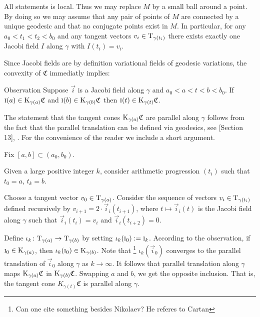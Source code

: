 \documentclass[a4paper,10pt]{article}
\begin{document}
{\color{red}  All statements is local.  Thus we may replace $M$ by a small ball around a point. By doing so we may assume that any pair of points of $M$ are connected by a unique geodesic and that no conjugate points exist in $M$.  In particular, for any $a_0<t_1<t_2<b_0$ and any tangent vectors $v_i \in \mathrm{T}_{\gamma (t_i)}$ there exists exactly one Jacobi field $I$ along $\gamma$ with
	$I(t_i)=v_i$.



Since Jacobi fields are by definition variational fields of geodesic variations, the convexity of $\mathfrak{C}$ immediatly implies: 

\begin{thm}{Observation}
	Suppose $\vec{i}$ is a Jacobi field along%
	 $\gamma$ and $a_0<a<t<b<b_0$. If 
	 $\text{\sc{i}}(a)\in \mathrm{K}_{\gamma(a)}\mathfrak{C}$ and $\text{\sc{i}}(b)\in \mathrm{K}_{\gamma(b)}\mathfrak{C}$
	then $\text{\sc{i}}(t)\in \mathrm{K}_{\gamma(t)}\mathfrak{C}$.
\end{thm}


 The statement that the tangent cones $\mathrm{K}_{\gamma(a)}\mathfrak{C}$  are parallel along $\gamma$ follows from the fact that the parallel translation can be defined via geodesics,
	see \cite{Ber-Nik}[Section 13], \cite{Petruninpar}. For the convenience of the reader we include a short argument.
	
	
	 Fix  $[a,b] \subset (a_0,b_0)$.}
Given a large positive integer $k$, consider arithmetic progression
$(t_i)$ such that $t_0=a$, $t_k=b$.

Choose a tangent vector $v_0\in\mathrm{T}_{\gamma(a)}$. 
Consider the sequence of vectors $v_i \in\mathrm{T}_{\gamma(t_i)}$ defined recursively by $v_{i+1}=2\cdot \vec{i}_i(t_{i+1})$, where $t\mapsto \vec{i}_i(t)$ is the Jacobi field along $\gamma$ such that $\vec{i}_i(t_i)=v_i$ and $\vec{i}_i(t_{i+2})=0$.

Define $\iota_k\colon\mathrm{T}_{\gamma(a)}\to \mathrm{T}_{\gamma(b)}$ by setting $\iota_k(\text{\sc{i}}_0)\mathrel{{:}{=}} \text{\sc{i}}_k$.
According to the observation, if $\text{\sc{i}}_0\in \mathrm{K}_{\gamma(a)}$, then $\iota_k(\text{\sc{i}}_0)\in \mathrm{K}_{\gamma(b)}$.
Note that \footnote{Can one cite something besides Nikolaev?  He referes to Cartan} $\iota_k(\vec{i}_0)$ converges to the parallel translation of $\vec{i}_0$ along $\gamma$ as $k\to \infty$.
It follows that parallel translation along $\gamma$ maps $\mathrm{K}_{\gamma(a)}\mathfrak{C}$ in $\mathrm{K}_{\gamma(b)}\mathfrak{C}$.
Swapping $a$ and $b$, we get the opposite inclusion.
That is, the tangent cone $K_{\gamma(t)}\mathfrak{C}$ is parallel along $\gamma$.
\end{document}
